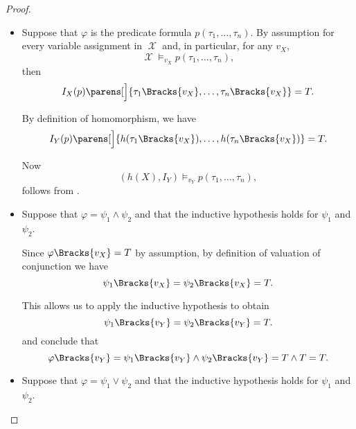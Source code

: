 \begin{proof}
\begin{itemize}
    \item Suppose that \( \varphi \) is the predicate formula \( p(\tau_1, \ldots, \tau_n) \). By assumption for every variable assignment in \( \mscrX \) and, in particular, for any \( v_X \),
    \begin{equation*}
      \mscrX \vDash_{v_X} p(\tau_1, \ldots, \tau_n),
    \end{equation*}
    then
    \begin{equation}\label{eq:thm:positive_formulas_preserved_under_homomorphism/predicates/x}
      I_X(p) \parens[\Big]{ \tau_1\Bracks{v_X}, \ldots, \tau_n\Bracks{v_X} } = T.
    \end{equation}

    By definition of homomorphism, we have
    \begin{equation}\label{eq:thm:positive_formulas_preserved_under_homomorphism/predicates/y}
      I_Y(p) \parens[\Big]{ h(\tau_1\Bracks{v_X}), \ldots, h(\tau_n\Bracks{v_X}) } = T.
    \end{equation}

    Now
    \begin{equation*}
      (h(X), I_Y) \vDash_{v_Y} p(\tau_1, \ldots, \tau_n),
    \end{equation*}
    follows from .

    \item Suppose that \( \varphi = \psi_1 \wedge \psi_2 \) and that the inductive hypothesis holds for \( \psi_1 \) and \( \psi_2 \).

    Since \( \varphi\Bracks{v_X} = T \) by assumption, by definition of valuation of conjunction we have
    \begin{equation*}
      \psi_1\Bracks{v_X}
      =
      \psi_2\Bracks{v_X}
      =
      T.
    \end{equation*}

    This allows us to apply the inductive hypothesis to obtain
    \begin{equation*}
      \psi_1\Bracks{v_Y}
      =
      \psi_2\Bracks{v_Y}
      =
      T.
    \end{equation*}
    and conclude that
    \begin{equation*}
      \varphi\Bracks{v_Y}
      =
      \psi_1\Bracks{v_Y} \wedge \psi_2\Bracks{v_Y}
      =
      T \wedge T
      =
      T.
    \end{equation*}

    \item Suppose that \( \varphi = \psi_1 \vee \psi_2 \) and that the inductive hypothesis holds for \( \psi_1 \) and \( \psi_2 \).


\end{itemize}
\end{proof}

